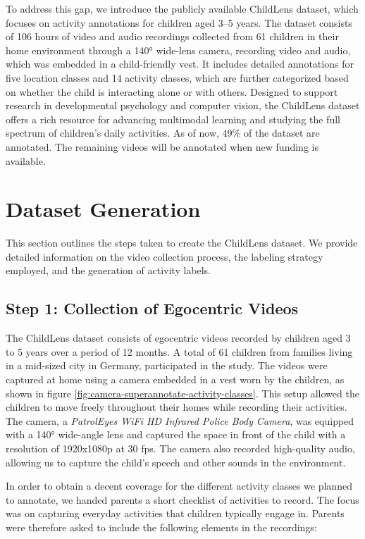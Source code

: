 \documentclass[
  man,floatsintext]{apa6}
\begin{document}
To address this gap, we introduce the publicly available ChildLens dataset, which focuses on activity annotations for children aged 3--5 years. The dataset consists of 106 hours of video and audio recordings collected from 61 children in their home environment through a 140° wide-lens camera, recording video and audio, which was embedded in a child-friendly vest. It includes detailed annotations for five location classes and 14 activity classes, which are further categorized based on whether the child is interacting alone or with others. Designed to support research in developmental psychology and computer vision, the ChildLens dataset offers a rich resource for advancing multimodal learning and studying the full spectrum of children's daily activities. As of now, 49\% of the dataset are annotated. The remaining videos will be annotated when new funding is available.

\section{Dataset Generation}\label{dataset-generation}

This section outlines the steps taken to create the ChildLens dataset. We provide detailed information on the video collection process, the labeling strategy employed, and the generation of activity labels.

\subsection{Step 1: Collection of Egocentric Videos}\label{step-1-collection-of-egocentric-videos}

The ChildLens dataset consists of egocentric videos recorded by children aged 3 to 5 years over a period of 12 months. A total of 61 children from families living in a mid-sized city in Germany, participated in the study. The videos were captured at home using a camera embedded in a vest worn by the children, as shown in figure \ref{fig:camera-superannotate-activity-classes}. This setup allowed the children to move freely throughout their homes while recording their activities. The camera, a \emph{PatrolEyes WiFi HD Infrared Police Body Camera}, was equipped with a 140° wide-angle lens and captured the space in front of the child with a resolution of 1920x1080p at 30 fps. The camera also recorded high-quality audio, allowing us to capture the child's speech and other sounds in the environment.

In order to obtain a decent coverage for the different activity classes we planned to annotate, we handed parents a short checklist of activities to record. The focus was on capturing everyday activities that children typically engage in. Parents were therefore asked to include the following elements in the recordings:
\end{document}
